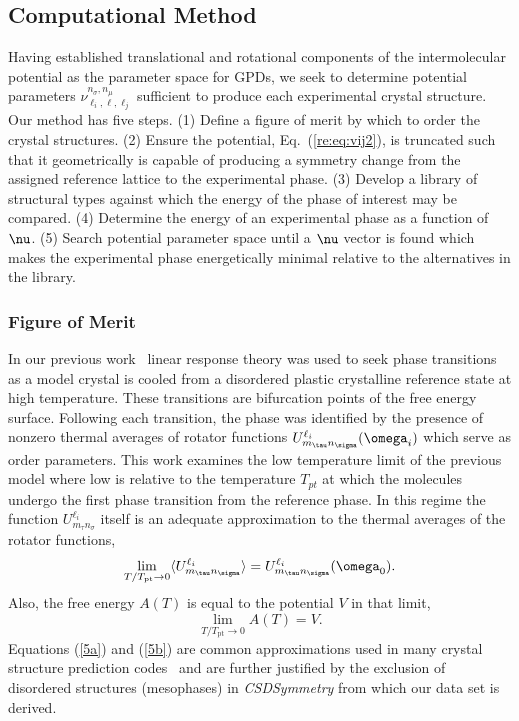 \documentclass[preprint]{iucr}              %
\newcommand{\mb}[1]{\ensuremath{\mbox{\boldmath $ #1 $}}}
\newcommand{\av}[1]{\ensuremath{\langle #1 \rangle}}
\begin{document}
\subsection{Computational Method}
\label{Computational_Strategy}

Having established translational and rotational components of the
intermolecular potential as the parameter space for GPDs, we seek to
determine potential parameters
$\nu_{\ell_i,\ell,\ell_j}^{n_\sigma,n_\mu}$ sufficient to produce
each experimental crystal structure. Our method has five steps. (1)
Define a figure of merit by which to order the crystal structures. (2)
Ensure the potential, Eq.~(\ref{re:eq:vij2}), is truncated such that
it geometrically is capable of producing a symmetry change from the
assigned reference lattice to the experimental phase. (3) Develop a
library of structural types against which the energy of the phase of interest
may be
compared. (4) Determine the energy of an experimental phase as a
function of $\mb{\nu}$. (5) Search potential parameter space until a
$\mb{\nu}$ vector is found which makes the experimental phase
energetically minimal relative to the alternatives in the library.

\subsubsection{Figure of Merit}

In our previous work~\cite{Keith04c,Mettes04} linear response theory
was used to seek phase transitions as a model crystal is cooled from
a disordered plastic crystalline reference state at high temperature. These
transitions are bifurcation points of the free energy surface.
Following each transition, the phase was identified by the presence
of nonzero thermal averages of rotator functions $U^{\ell_i}_{m_\tau
n_\sigma}(\mb{\omega}_i)$ which serve as order parameters. This work
examines the low temperature limit of the previous model where low
is relative to the temperature $T_{pt}$ at which the molecules
undergo the first
phase transition from the reference phase. 
In this regime the function $U^{\ell_i}_{m_\tau n_\sigma}$ itself is
an adequate approximation to the thermal averages of the rotator
functions,
\begin{equation}\label{5a}
\lim_{T/T_{\mathrm{pt}}\rightarrow 0}\av{U^{\ell_i}_{m_\tau
n_\sigma}}=U^{\ell_i}_{m_\tau n_\sigma}(\mb{\omega}_0).
\end{equation}
Also, the free energy $A(T)$ is equal to the potential $V$ in that limit,
\begin{equation}\label{5b}
\lim_{T/T_{\mathrm{pt}}\rightarrow 0}A(T)=V.
\end{equation}
Equations (\ref{5a}) and (\ref{5b}) are common approximations used in
many crystal structure prediction codes~\cite{Verwer98} and are
further justified by the exclusion of disordered structures (mesophases) in
\emph{CSDSymmetry} from which our data set is derived.
\end{document}
